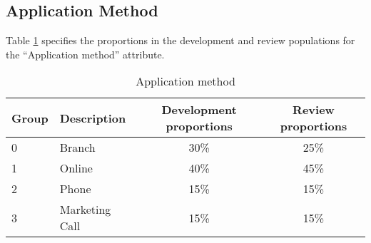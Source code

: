 \documentclass{article}
\theoremstyle{def}
\begin{document}
\subsection{Application Method}

Table \ref{AppMeth_unstablechange} specifies the proportions in the development and review populations for the ``Application method'' attribute.
\begin{table}[H]%
\caption{Application method}
\label{AppMeth_unstablechange}
\centering
\small
\begin{tabular}{llcc}
\hline
Group & Description & Development proportions & Review proportions \\
\hline
0 & Branch & 30\%  & 25\%\\
1 & Online & 40\%  & 45\%\\
2 & Phone & 15\% & 15\%\\
3 & Marketing Call & 15\% & 15\%\\
\hline
\end{tabular}
\end{table}  



\end{document}
